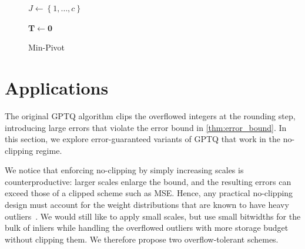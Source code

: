 \documentclass{article} %
\begin{document}
\begin{figure}[!ht]
\centering
\begin{minipage}[t]{\linewidth}
\IncMargin{1.5em}
\begin{algorithm}[H]
\caption{Min-Pivot}
\label{alg:ldl_pivot}
\LinesNumbered
{}


$J \leftarrow \left\{ 1, \dots, c \right\}$

$\bm{T} \leftarrow \bm{0}$


\end{algorithm}
\end{minipage}
\end{figure}

\section{Applications}
\label{sec:experiments}

The original GPTQ algorithm clips the overflowed integers at the rounding step, introducing large errors that violate the error bound in \cref{thm:error_bound}.
In this section, we explore error-guaranteed variants of GPTQ that work in the no-clipping regime.

We notice that enforcing no-clipping by simply increasing scales is counterproductive: larger scales enlarge the bound, and the resulting errors can exceed those of a clipped scheme such as MSE.
Hence, any practical no-clipping design must account for the weight distributions that are known to have heavy outliers~\citep{li2025icquant}.
We would still like to apply small scales, but use small bitwidths for the bulk of inliers while handling the overflowed outliers with more storage budget without clipping them.
We therefore propose two overflow-tolerant schemes.
\end{document}
